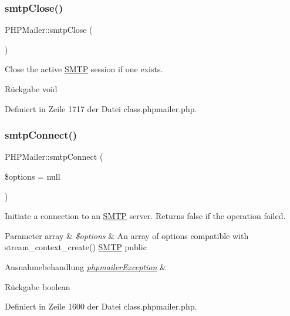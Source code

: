 \subsubsection{\texorpdfstring{smtp\+Close()}{smtpClose()}}
{\footnotesize\ttfamily P\+H\+P\+Mailer\+::smtp\+Close (\begin{DoxyParamCaption}{ }\end{DoxyParamCaption})}

Close the active \mbox{\hyperlink{class_s_m_t_p}{S\+M\+TP}} session if one exists. \begin{DoxyReturn}{Rückgabe}
void 
\end{DoxyReturn}


Definiert in Zeile 1717 der Datei class.\+phpmailer.\+php.

\mbox{\label{class_p_h_p_mailer_ad256b0d8cead706e1ed69ad148075773}} 
\subsubsection{\texorpdfstring{smtp\+Connect()}{smtpConnect()}}
{\footnotesize\ttfamily P\+H\+P\+Mailer\+::smtp\+Connect (\begin{DoxyParamCaption}\item[{}]{\$options = {\ttfamily null} }\end{DoxyParamCaption})}

Initiate a connection to an \mbox{\hyperlink{class_s_m_t_p}{S\+M\+TP}} server. Returns false if the operation failed. 
\begin{DoxyParams}[1]{Parameter}
array & {\em \$options} & An array of options compatible with stream\+\_\+context\+\_\+create()  \mbox{\hyperlink{class_s_m_t_p}{S\+M\+TP}}  public \\
\hline
\end{DoxyParams}

\begin{DoxyExceptions}{Ausnahmebehandlung}
{\em \mbox{\hyperlink{classphpmailer_exception}{phpmailer\+Exception}}} & \\
\hline
\end{DoxyExceptions}
\begin{DoxyReturn}{Rückgabe}
boolean 
\end{DoxyReturn}


Definiert in Zeile 1600 der Datei class.\+phpmailer.\+php.

